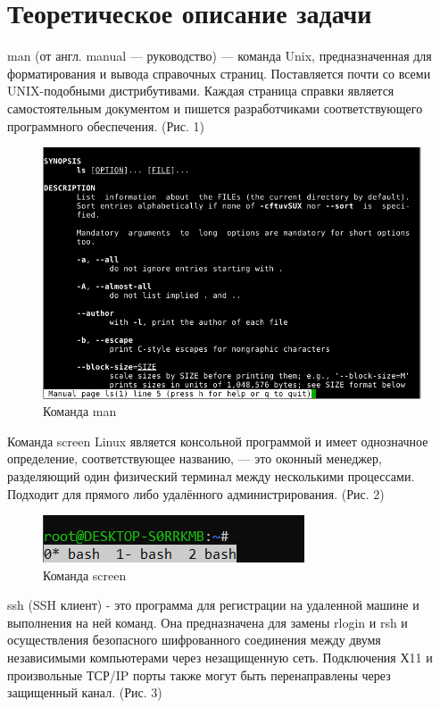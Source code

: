 \documentclass[a4paper,14pt]{extarticle}
\begin{document}
\section{Теоретическое описание задачи}
man (от англ. manual — руководство) — команда Unix, предназначенная для форматирования и вывода справочных страниц. Поставляется почти со всеми UNIX-подобными дистрибутивами. Каждая страница справки является самостоятельным документом и пишется разработчиками соответствующего программного обеспечения. (Рис. 1)

\begin{figure}[h!]

\centering
\includegraphics[width=1\linewidth]{man.png}
\caption{Команда man}
\label{fig:mpr}
\end{figure}

Команда screen Linux является консольной программой и имеет однозначное определение, соответствующее названию, — это оконный менеджер, разделяющий один физический терминал между несколькими процессами. Подходит для прямого либо удалённого администрирования. (Рис. 2)

\begin{figure}[h!]
\centering
\includegraphics[width=1\linewidth]{screen.png}
\caption{Команда screen}
\label{fig:mpr}
\end{figure}

ssh (SSH клиент) - это программа для регистрации на удаленной машине и выполнения на ней команд. Она предназначена для замены rlogin и rsh и осуществления безопасного шифрованного соединения между двумя независимыми компьютерами через незащищенную сеть. Подключения Х11 и произвольные ТСР/IP порты также могут быть перенаправлены через защищенный канал.  (Рис. 3)
\end{document}
